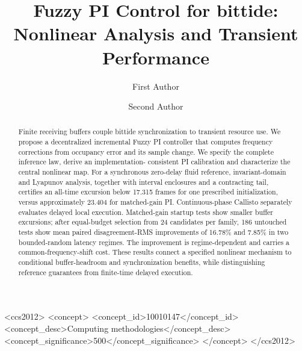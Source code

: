 \documentclass[sigconf]{acmart}
\begin{document}
\title[Fuzzy PI Control for bittide]{Fuzzy PI Control for bittide: Nonlinear Analysis and Transient Performance}

\author{First Author}

\author{Second Author}

\renewcommand{\shortauthors}{First Author and Second Author}

\begin{abstract}
Finite receiving buffers couple bittide synchronization to transient
resource use. We propose a decentralized incremental Fuzzy PI controller
that computes frequency corrections from occupancy error and its sample
change. We specify the complete inference law, derive an implementation-
consistent PI calibration and characterize the central nonlinear map.
For a synchronous zero-delay fluid reference, invariant-domain and
Lyapunov analysis, together with interval enclosures and a contracting
tail, certifies an all-time excursion below 17.315 frames for one
prescribed initialization, versus approximately 23.404 for matched-gain
PI. Continuous-phase Callisto separately evaluates delayed local
execution. Matched-gain startup tests show smaller buffer excursions;
after equal-budget selection from 24 candidates per family, 186 untouched
tests show mean paired disagreement-RMS improvements of 16.78\% and
7.85\% in two bounded-random latency regimes. The improvement is
regime-dependent and carries a common-frequency-shift cost. These
results connect a specified nonlinear mechanism to conditional
buffer-headroom and synchronization benefits, while distinguishing
reference guarantees from finite-time delayed execution.
\end{abstract}


\begin{CCSXML}
<ccs2012>
 <concept>
  <concept_id>10010147</concept_id>
  <concept_desc>Computing methodologies</concept_desc>
  <concept_significance>500</concept_significance>
 </concept>
</ccs2012>
\end{CCSXML}

\maketitle
\end{document}
